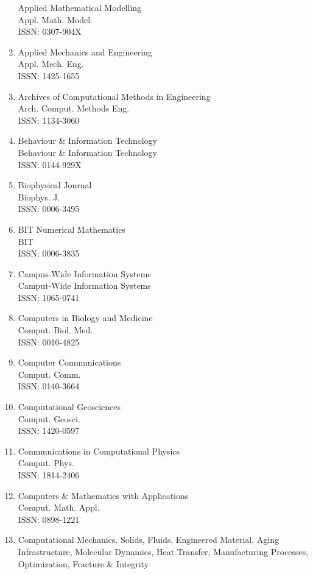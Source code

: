\begin{enumerate}
 Applied Mathematical Modelling\\
 Appl. Math. Model.\\
 ISSN: 0307-904X
\item
 Applied Mechanics and Engineering\\
 Appl. Mech. Eng.\\
 ISSN: 1425-1655
\item
 Archives of Computational Methods in Engineering\\
 Arch. Comput. Methods Eng.\\
 ISSN: 1134-3060
\item
 Behaviour \& Information Technology\\
 Behaviour \& Information Technology\\
 ISSN: 0144-929X
\item
 Biophysical Journal\\
 Biophys. J.\\
 ISSN: 0006-3495
\item
 BIT Numerical Mathematics\\
 BIT\\
 ISSN: 0006-3835
\item
 Campus-Wide Information Systems\\
 Camput-Wide Information Systems\\
 ISSN: 1065-0741
\item
 Computers in Biology and Medicine\\
 Comput. Biol. Med.\\
 ISSN: 0010-4825
\item
 Computer Communications\\
 Comput. Comm.\\
 ISSN: 0140-3664
\item
 Computational Geosciences\\
 Comput. Geosci.\\
 ISSN: 1420-0597
\item
 Communications in Computational Physics\\
 Comput. Phys.\\
 ISSN: 1814-2406
\item
 Computers \& Mathematics with Applications\\
 Comput. Math. Appl.\\
 ISSN: 0898-1221
\item
 Computational Mechanics. Solids, Fluids, Engineered Material, Aging Infrastructure, Molecular Dynamics, Heat Transfer, Manufacturing Processes, Optimization, Fracture \& Integrity\\

\end{enumerate}
